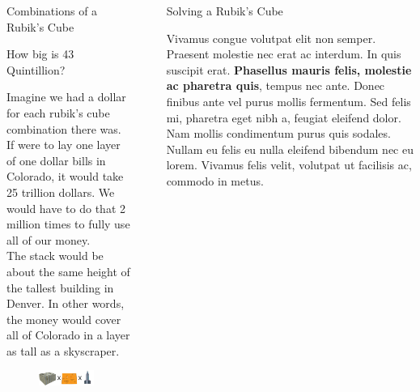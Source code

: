 \documentclass[final]{beamer}
\newlength{\sepwidth}
\newlength{\colwidth}
\newcommand{\separatorcolumn}{\begin{column}{\sepwidth}\end{column}}
\begin{document}
\begin{frame}[t]
\begin{columns}[t]
\begin{column}{\colwidth}
\begin{block}{Combinations of a Rubik's Cube}
  \end{block}

  \begin{block}{How big is 43 Quintillion?}

    \large 
    Imagine we had a dollar for each rubik's cube combination there was. If were to lay one layer of one dollar bills in
    Colorado, it would take 25 trillion dollars. We would have to do that 2 million times to fully use all of our money. \\
    The stack would be about the same height of the tallest building in Denver. In other words,
    the money would cover all of Colorado in a layer as tall as a skyscraper.
    \begin{figure}
      \centering
                    \includegraphics[width=0.9\textwidth]{logos/moneyvisual.png}
    \end{figure}

  \end{block}

\end{column}

\separatorcolumn

\begin{column}{\colwidth}

  \begin{block}{Solving a Rubik's Cube}

    \large Vivamus congue volutpat elit non semper. Praesent molestie nec erat ac
    interdum. In quis suscipit erat. \textbf{Phasellus mauris felis, molestie
    ac pharetra quis}, tempus nec ante. Donec finibus ante vel purus mollis
    fermentum. Sed felis mi, pharetra eget nibh a, feugiat eleifend dolor. Nam
    mollis condimentum purus quis sodales. Nullam eu felis eu nulla eleifend
    bibendum nec eu lorem. Vivamus felis velit, volutpat ut facilisis ac,
    commodo in metus.


\end{block}
\end{column}
\end{columns}
\end{frame}
\end{document}
